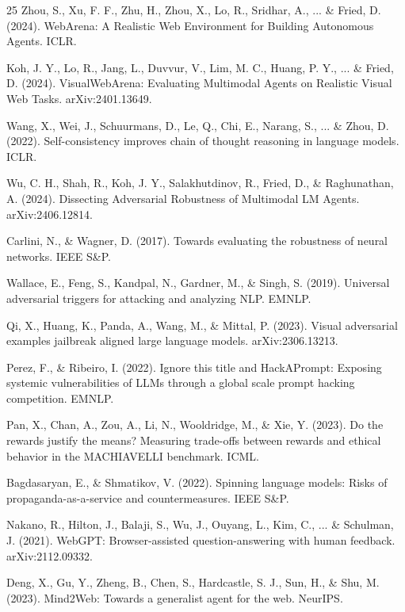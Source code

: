 \documentclass{llncs}
\begin{document}
\begin{thebibliography}{25}
Zhou, S., Xu, F. F., Zhu, H., Zhou, X., Lo, R., Sridhar, A., ... \& Fried, D. (2024). WebArena: A Realistic Web Environment for Building Autonomous Agents. ICLR.

Koh, J. Y., Lo, R., Jang, L., Duvvur, V., Lim, M. C., Huang, P. Y., ... \& Fried, D. (2024). VisualWebArena: Evaluating Multimodal Agents on Realistic Visual Web Tasks. arXiv:2401.13649.

Wang, X., Wei, J., Schuurmans, D., Le, Q., Chi, E., Narang, S., ... \& Zhou, D. (2022). Self-consistency improves chain of thought reasoning in language models. ICLR.

Wu, C. H., Shah, R., Koh, J. Y., Salakhutdinov, R., Fried, D., \& Raghunathan, A. (2024). Dissecting Adversarial Robustness of Multimodal LM Agents. arXiv:2406.12814.

Carlini, N., \& Wagner, D. (2017). Towards evaluating the robustness of neural networks. IEEE S\&P.

Wallace, E., Feng, S., Kandpal, N., Gardner, M., \& Singh, S. (2019). Universal adversarial triggers for attacking and analyzing NLP. EMNLP.

Qi, X., Huang, K., Panda, A., Wang, M., \& Mittal, P. (2023). Visual adversarial examples jailbreak aligned large language models. arXiv:2306.13213.

Perez, F., \& Ribeiro, I. (2022). Ignore this title and HackAPrompt: Exposing systemic vulnerabilities of LLMs through a global scale prompt hacking competition. EMNLP.

Pan, X., Chan, A., Zou, A., Li, N., Wooldridge, M., \& Xie, Y. (2023). Do the rewards justify the means? Measuring trade-offs between rewards and ethical behavior in the MACHIAVELLI benchmark. ICML.

Bagdasaryan, E., \& Shmatikov, V. (2022). Spinning language models: Risks of propaganda-as-a-service and countermeasures. IEEE S\&P.

Nakano, R., Hilton, J., Balaji, S., Wu, J., Ouyang, L., Kim, C., ... \& Schulman, J. (2021). WebGPT: Browser-assisted question-answering with human feedback. arXiv:2112.09332.

Deng, X., Gu, Y., Zheng, B., Chen, S., Hardcastle, S. J., Sun, H., \& Shu, M. (2023). Mind2Web: Towards a generalist agent for the web. NeurIPS.


\end{thebibliography}
\end{document}
